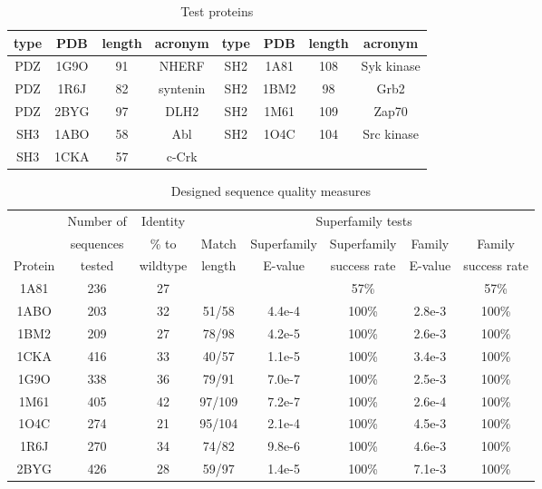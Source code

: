 \documentclass[a4paper,12pt]{article}
\begin{document}
\begin{table}[H]                            
\caption{Test proteins}
\label{tab:proteins}                      
\begin{center}
\begin{tabular}{cccccccc} \hline \hline  
type & PDB  & length & acronym  & type & PDB  & length & acronym \\ \hline
PDZ  & 1G9O &  91    & NHERF    & SH2  & 1A81 & 108    & Syk kinase \\ 
PDZ  & 1R6J &  82    & syntenin & SH2  & 1BM2 &  98    & Grb2       \\
PDZ  & 2BYG &  97    & DLH2     & SH2  & 1M61 & 109    & Zap70      \\
SH3  & 1ABO &  58    & Abl      & SH2  & 1O4C & 104    & Src kinase \\
SH3  & 1CKA &  57    & c-Crk    &      &      &        &     \\ \hline
\end{tabular}
\end{center}
\end{table}


\begin{table}[H]                            
\caption{Designed sequence quality measures}
\small
\label{tab:quality}                      
\begin{center}
\begin{tabular}{cccccccc} \hline \hline  
        & Number of & Identity & \multicolumn{5}{c}{\hrulefill Superfamily tests \hrulefill}  \\
        & sequences & \% to    & Match & Superfamily & Superfamily  & Family  & Family        \\
Protein & tested    & wildtype & length & E-value     & success rate & E-value & success rate \\ \hline
1A81    & 236       & 27       &        &             &  57\%        &         &  57\%        \\
1ABO    & 203       & 32       & 51/58  & 4.4e-4      & 100\%        & 2.8e-3  & 100\%        \\
1BM2    & 209       & 27       & 78/98  & 4.2e-5      & 100\%        & 2.6e-3  & 100\%        \\
1CKA    & 416       & 33       & 40/57  & 1.1e-5      & 100\%        & 3.4e-3  & 100\%        \\
1G9O    & 338       & 36       & 79/91  & 7.0e-7      & 100\%        & 2.5e-3  & 100\%        \\
1M61    & 405       & 42       & 97/109 & 7.2e-7      & 100\%        & 2.6e-4  & 100\%        \\
1O4C    & 274       & 21       & 95/104 & 2.1e-4      & 100\%        & 4.5e-3  & 100\%        \\
1R6J    & 270       & 34       & 74/82  & 9.8e-6      & 100\%        & 4.6e-3  & 100\%        \\
2BYG    & 426       & 28       & 59/97  & 1.4e-5      & 100\%        & 7.1e-3  & 100\%        \\ \hline
\end{tabular}
\end{center}
\end{table}
\end{document}
